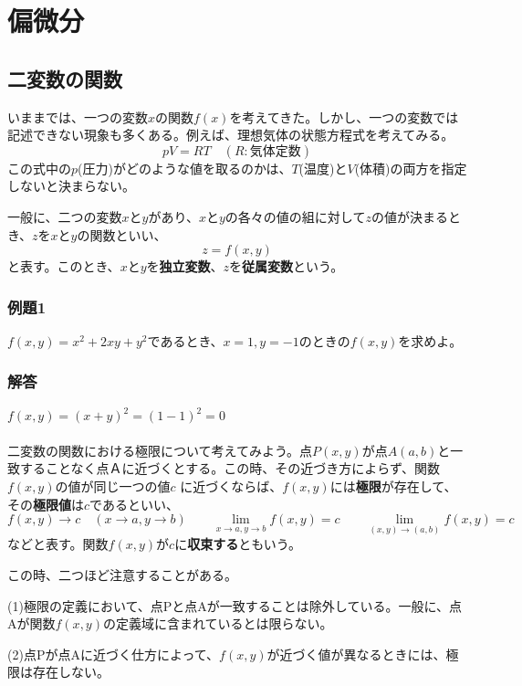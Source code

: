 \documentclass[a4j,dvipdfmx]{jsarticle}
\begin{document}
\section*{偏微分}
\subsection{二変数の関数}
いままでは、一つの変数$x$の関数$f(x)$を考えてきた。しかし、一つの変数では記述できない現象も多くある。例えば、理想気体の状態方程式を考えてみる。
\begin{equation*}
    pV=RT\quad(R:\text{気体定数})
\end{equation*}
この式中の$p$(圧力)がどのような値を取るのかは、$T$(温度)と$V$(体積)の両方を指定しないと決まらない。

一般に、二つの変数$x$と$y$があり、$x$と$y$の各々の値の組に対して$z$の値が決まるとき、$z$を$x$と$y$の関数といい、
\begin{equation*}
    z=f(x,y)
\end{equation*}
と表す。このとき、$x$と$y$を\textbf{独立変数}、$z$を\textbf{従属変数}という。
\subsubsection*{例題1}
$f(x,y)=x^2+2xy+y^2$であるとき、$x=1,y=-1$のときの$f(x,y)$を求めよ。

\subsubsection*{解答}
$f(x,y)=(x+y)^2=(1-1)^2=0$
\\\\
二変数の関数における極限について考えてみよう。点$P(x,y)$が点$A(a,b)$と一致することなく点Ａに近づくとする。この時、その近づき方によらず、関数$f(x,y)$の値が同じ一つの値$c$
に近づくならば、$f(x,y)$には\textbf{極限}が存在して、その\textbf{極限値}は$c$であるといい、
\begin{equation*}
    f(x,y)\to c\quad(x\to a,y\to b)\qquad\lim_{x\to a,y\to b}f(x,y)=c\qquad\lim_{(x,y)\to(a,b)}f(x,y)=c
\end{equation*}
などと表す。関数$f(x,y)$が$c$に\textbf{収束する}ともいう。

この時、二つほど注意することがある。

(1)極限の定義において、点Pと点Aが一致することは除外している。一般に、点Aが関数$f(x,y)$の定義域に含まれているとは限らない。

(2)点Pが点Aに近づく仕方によって、$f(x,y)$が近づく値が異なるときには、極限は存在しない。
\end{document}
